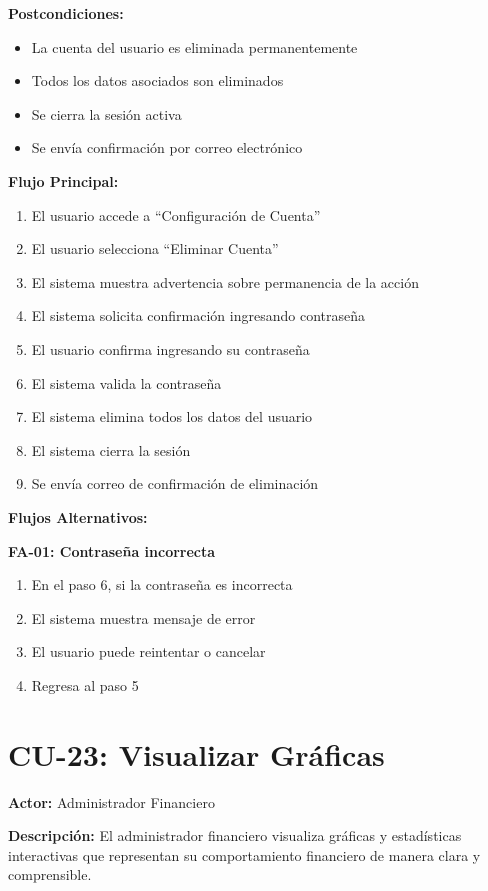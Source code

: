 \noindent\textbf{Postcondiciones:}
\begin{itemize}
    \item La cuenta del usuario es eliminada permanentemente
    \item Todos los datos asociados son eliminados
    \item Se cierra la sesión activa
    \item Se envía confirmación por correo electrónico
\end{itemize}

\noindent\textbf{Flujo Principal:}
\begin{enumerate}
    \item El usuario accede a ``Configuración de Cuenta''
    \item El usuario selecciona ``Eliminar Cuenta''
    \item El sistema muestra advertencia sobre permanencia de la acción
    \item El sistema solicita confirmación ingresando contraseña
    \item El usuario confirma ingresando su contraseña
    \item El sistema valida la contraseña
    \item El sistema elimina todos los datos del usuario
    \item El sistema cierra la sesión
    \item Se envía correo de confirmación de eliminación
\end{enumerate}

\noindent\textbf{Flujos Alternativos:}

\textbf{FA-01: Contraseña incorrecta}
\begin{enumerate}
    \item En el paso 6, si la contraseña es incorrecta
    \item El sistema muestra mensaje de error
    \item El usuario puede reintentar o cancelar
    \item Regresa al paso 5
\end{enumerate}

\section{CU-23: Visualizar Gráficas}

\noindent\textbf{Actor:} Administrador Financiero

\noindent\textbf{Descripción:} El administrador financiero visualiza gráficas y estadísticas interactivas que representan su comportamiento financiero de manera clara y comprensible.

